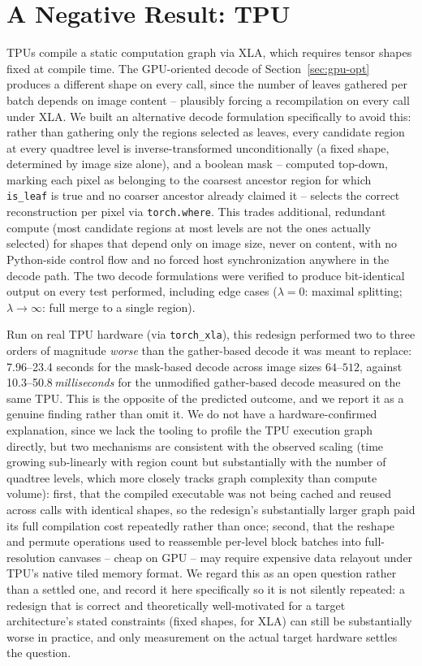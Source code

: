 \documentclass[11pt]{article}
\begin{document}
\section{A Negative Result: TPU}
\label{sec:tpu}

TPUs compile a static computation graph via XLA, which requires tensor
shapes fixed at compile time. The GPU-oriented decode of
Section~\ref{sec:gpu-opt} produces a different shape on every call, since
the number of leaves gathered per batch depends on image content --
plausibly forcing a recompilation on every call under XLA. We built an
alternative decode formulation specifically to avoid this: rather than
gathering only the regions selected as leaves, every candidate region at
every quadtree level is inverse-transformed unconditionally (a fixed shape,
determined by image size alone), and a boolean mask -- computed top-down,
marking each pixel as belonging to the coarsest ancestor region for which
\texttt{is\_leaf} is true and no coarser ancestor already claimed it -- selects
the correct reconstruction per pixel via \texttt{torch.where}. This trades
additional, redundant compute (most candidate regions at most levels are not
the ones actually selected) for shapes that depend only on image size, never
on content, with no Python-side control flow and no forced host
synchronization anywhere in the decode path. The two decode formulations
were verified to produce bit-identical output on every test performed,
including edge cases ($\lambda=0$: maximal splitting; $\lambda\to\infty$:
full merge to a single region).

Run on real TPU hardware (via \texttt{torch\_xla}), this redesign performed
two to three orders of magnitude \emph{worse} than the gather-based decode
it was meant to replace: 7.96--23.4 seconds for the mask-based decode across
image sizes $64$--$512$, against 10.3--50.8\,\emph{milliseconds} for the
unmodified gather-based decode measured on the same TPU. This is the
opposite of the predicted outcome, and we report it as a genuine finding
rather than omit it. We do not have a hardware-confirmed explanation, since
we lack the tooling to profile the TPU execution graph directly, but two
mechanisms are consistent with the observed scaling (time growing
sub-linearly with region count but substantially with the number of
quadtree levels, which more closely tracks graph complexity than compute
volume): first, that the compiled executable was not being cached and reused
across calls with identical shapes, so the redesign's substantially larger
graph paid its full compilation cost repeatedly rather than once; second,
that the reshape and permute operations used to reassemble per-level block
batches into full-resolution canvases -- cheap on GPU -- may require
expensive data relayout under TPU's native tiled memory format. We regard
this as an open question rather than a settled one, and record it here
specifically so it is not silently repeated: a redesign that is correct and
theoretically well-motivated for a target architecture's stated constraints
(fixed shapes, for XLA) can still be substantially worse in practice, and
only measurement on the actual target hardware settles the question.
\end{document}

